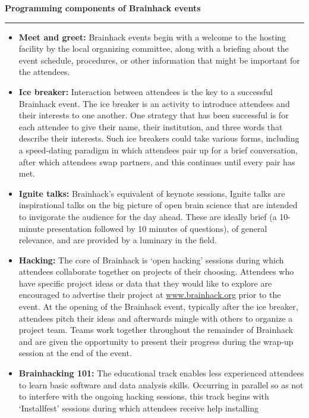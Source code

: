\begin{table}[!ht]
\caption{{\bf Programming components of Brainhack events}\label{tab4}}
\hrule %
    \begin{itemize}
    \item
        \textbf{Meet and greet:} Brainhack events begin with a welcome to the hosting facility by the local organizing committee, along with a briefing about the event schedule, procedures, or other information that might be important for the attendees.
    \item
        \textbf{Ice breaker:} Interaction between attendees is the key to a successful Brainhack event. The ice breaker is an activity to introduce attendees and their interests %
to one another. One strategy that has been successful is for each attendee to give their name, their institution, and three words that describe their interests. Such ice breakers could take various forms, including a speed-dating paradigm in which attendees pair up for a brief conversation, after which attendees swap partners, and this continues until every pair has met.
    \item
        \textbf{Ignite talks:} Brainhack's equivalent of keynote sessions, Ignite talks are inspirational talks on the big picture of open brain science that are intended to invigorate the audience for the day ahead. These are ideally brief (a %
10-minute presentation followed by %
10 minutes of questions), of general relevance, and are provided by a luminary in the field.
    \item
        \textbf{Hacking:} The core of Brainhack is `open hacking' sessions during which attendees collaborate together on projects of their choosing. Attendees who have specific project ideas or data that they would like to explore are encouraged to advertise their project at \href{http://www.brainhack.org}{www.brainhack.org} prior to the event. %
At the opening of the Brainhack event, typically after the ice breaker, attendees pitch their ideas and afterwards mingle with others to organize a project team. Teams work together throughout the remainder of Brainhack and are given the opportunity to present their progress during the wrap-up session at the end of the event.
    \item
        \textbf{Brainhacking 101:} The educational track enables less experienced attendees to learn basic software and data analysis skills. Occurring in parallel so as not to interfere with the ongoing hacking sessions, this track begins with `Installfest' sessions during which attendees receive help installing %

\end{itemize}
\end{table}
